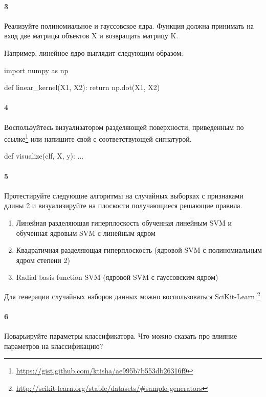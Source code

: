 \documentclass[a4paper,12pt]{article}
\begin{document}
\paragraph{3} Реализуйте полиномиальное и гауссовское ядра. Функция должна принимать на вход две матрицы объектов X и возвращать матрицу K.

Например, линейное ядро выглядит следующим образом:
\begin{python3}
import numpy as np

def linear_kernel(X1, X2):
    return np.dot(X1, X2)
\end{python3}

\paragraph{4} Воспользуйтесь визуализатором разделяющей поверхности, приведенным по ссылке\footnote{\url{https://gist.github.com/ktisha/ae995b7b553db26316f9}} или напишите свой с соответствующей сигнатурой.

\begin{python3}
def visualize(clf, X, y):
  ...
\end{python3}


\paragraph{5} Протестируйте следующие алгоритмы на случайных выборках с признаками длины 2 и визуализируйте на плоскости получающиеся решающие правила.
\begin{enumerate}
  \item Линейная разделяющая гиперплоскость обученная линейным SVM и обученная ядровым SVM с линейным ядром
  \item Квадратичная разделяющая гиперплоскость (ядровой SVM с полиномиальным ядром степени 2)
  \item Radial basis function SVM (ядровой SVM с гауссовским ядром)
\end{enumerate}

Для генерации случайных наборов данных можно воспользоваться SciKit-Learn \footnote{\url{http://scikit-learn.org/stable/datasets/\#sample-generators}}

\paragraph{6} Поварьируйте параметры классификатора. Что можно сказать про влияние параметров на классификацию?\\
\end{document}
